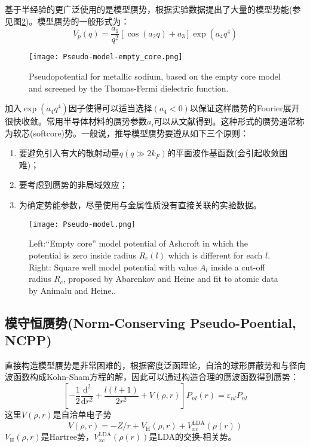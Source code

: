 基于半经验的更广泛使用的是模型赝势，根据实验数据提出了大量的模型势能\cite{PM9-451_1964,PM12-529_1965,JPF2-270_1972,PRB11-2717_1975,PRB11-2726_1975,JPF6-L271_1976,PR174-769_1968}(参见图\ref{Pseudo-model})。模型赝势的一般形式为：
\begin{equation}
  V_p(q)=\frac{a_1}{q^2}[\cos(a_2q)+a_3]\exp(a_4q^4)
  \label{eq:solid-102}
\end{equation}
\begin{figure}[h!]
\centering
\texttt{[image: Pseudo-model-empty\_core.png]}
\caption{\small \textrm{Pseudopotential for metallic sodium, based on the empty core model and screened by the Thomas-Fermi dielectric function.}}%
\label{Pseudo_model-empty_core}
\end{figure}
加入$\exp(a_4q^4)$因子使得可以适当选择$(a_4<0)$以保证这样赝势的Fourier展开很快收敛。常用半导体材料的赝势参数$a_i$可以从文献\cite{PRB15-2154_1977}得到。这种形式的赝势通常称为软芯(softcore)势。一般说，推导模型赝势要遵从如下三个原则：
\begin{enumerate}
  \item 
要避免引入有大的散射动量$q(q\gg 2k_F)$的平面波作基函数(会引起收敛困难)；%
  \item 
要考虑到赝势的非局域效应；
  \item 
为确定势能参数，尽量使用与金属性质没有直接关联的实验数据。
\end{enumerate}
\begin{figure}[h!]
\centering
\texttt{[image: Pseudo-model.png]}
\caption{\small \textrm{Left:``Empty core'' model potential of Ashcroft in which the potential is zero inside radius $R_c(l)$ which is different for each $l$. Right: Square well model potential with value $A_l$ inside a cut-off radius $R_c$, proposed by Abarenkov and Heine and fit to atomic data by Animalu and Heine..}}%
\label{Pseudo-model}
\end{figure}

\subsection{模守恒赝势\textrm(Norm-Conserving Pseudo-Poential, NCPP)}
直接构造模型赝势是非常困难的，根据密度泛函理论，自洽的球形屏蔽势和与径向波函数构成Kohn-Sham方程的解，因此可以通过构造合理的赝波函数得到赝势：
\begin{equation}
	\left[-\frac12\frac{\mathrm{d}^2}{\mathrm{d}r^2}+\frac{l(l+1)}{2r^2}+V(\rho,r)\right]P_{nl}(r)=\varepsilon_{nl}P_{nl}
  \label{eq:solid-103}
\end{equation}
这里$V(\rho,r)$是自洽单电子势$$V(\rho,r)=-Z/r+V_{\mathrm{H}}(\rho,r)+V_{xc}^{\mathrm{LDA}}(\rho(r))$$
$V_{\mathrm{H}}(\rho,r)$是Hartree势，$V_{xc}^{\mathrm{LDA}}(\rho(r))$是LDA的交换-相关势。

